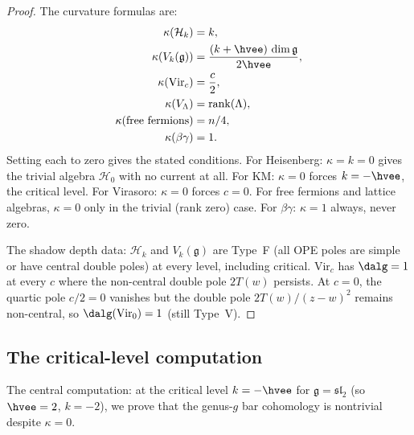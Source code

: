 \documentclass[11pt]{article}
\newcommand{\cH}{\mathcal{H}}
\newcommand{\fg}{\mathfrak{g}}
\newcommand{\fsl}{\mathfrak{sl}}
\begin{document}
\begin{proof}
The curvature formulas are:
\begin{align*}
\kappa(\cH_k) &= k, \\
\kappa(V_k(\fg)) &= \frac{(k + \hvee)\,\dim\fg}{2\hvee}, \\
\kappa(\mathrm{Vir}_c) &= \frac{c}{2}, \\
\kappa(V_\Lambda) &= \mathrm{rank}(\Lambda), \\
\kappa(\text{free fermions}) &= n/4, \\
\kappa(\beta\gamma) &= 1.
\end{align*}
Setting each to zero gives the stated conditions.
For Heisenberg: $\kappa = k = 0$ gives the trivial algebra
$\cH_0$ with no current at all.
For KM: $\kappa = 0$ forces $k = -\hvee$, the critical level.
For Virasoro: $\kappa = 0$ forces $c = 0$.
For free fermions and lattice algebras, $\kappa = 0$ only in
the trivial (rank zero) case.
For $\beta\gamma$: $\kappa = 1$ always, never zero.

The shadow depth data: $\cH_k$ and $V_k(\fg)$ are Type~F
(all OPE poles are simple or have central double poles) at
every level, including critical.
$\mathrm{Vir}_c$ has $\dalg = 1$ at every $c$ where the
non-central double pole $2T(w)$ persists.
At $c = 0$, the quartic pole $c/2 = 0$ vanishes but
the double pole $2T(w)/(z-w)^2$ remains non-central,
so $\dalg(\mathrm{Vir}_0) = 1$ (still Type~V).
\end{proof}

\subsection{The critical-level computation}

The central computation: at the critical level
$k = -\hvee$ for $\fg = \fsl_2$ (so $\hvee = 2$,
$k = -2$), we prove that the genus-$g$ bar cohomology
is nontrivial despite $\kappa = 0$.
\end{document}

